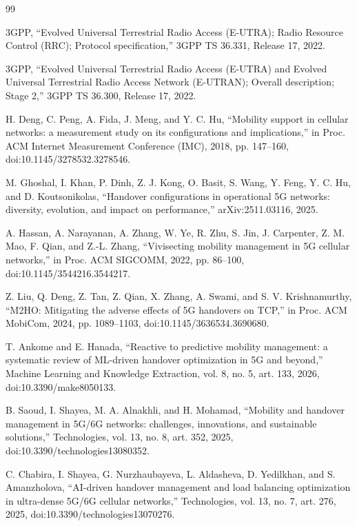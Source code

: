 \begin{thebibliography}{99}
\singlespacing
{} 3GPP, ``Evolved Universal Terrestrial Radio Access (E-UTRA); Radio Resource Control (RRC); Protocol specification,'' 3GPP TS 36.331, Release 17, 2022.

 3GPP, ``Evolved Universal Terrestrial Radio Access (E-UTRA) and Evolved Universal Terrestrial Radio Access Network (E-UTRAN); Overall description; Stage 2,'' 3GPP TS 36.300, Release 17, 2022.

 H. Deng, C. Peng, A. Fida, J. Meng, and Y. C. Hu, ``Mobility support in cellular networks: a measurement study on its configurations and implications,'' in Proc. ACM Internet Measurement Conference (IMC), 2018, pp. 147--160, doi:10.1145/3278532.3278546.

 M. Ghoshal, I. Khan, P. Dinh, Z. J. Kong, O. Basit, S. Wang, Y. Feng, Y. C. Hu, and D. Koutsonikolas, ``Handover configurations in operational 5G networks: diversity, evolution, and impact on performance,'' arXiv:2511.03116, 2025.

 A. Hassan, A. Narayanan, A. Zhang, W. Ye, R. Zhu, S. Jin, J. Carpenter, Z. M. Mao, F. Qian, and Z.-L. Zhang, ``Vivisecting mobility management in 5G cellular networks,'' in Proc. ACM SIGCOMM, 2022, pp. 86--100, doi:10.1145/3544216.3544217.

 Z. Liu, Q. Deng, Z. Tan, Z. Qian, X. Zhang, A. Swami, and S. V. Krishnamurthy, ``M2HO: Mitigating the adverse effects of 5G handovers on TCP,'' in Proc. ACM MobiCom, 2024, pp. 1089--1103, doi:10.1145/3636534.3690680.

 T. Ankome and E. Hanada, ``Reactive to predictive mobility management: a systematic review of ML-driven handover optimization in 5G and beyond,'' Machine Learning and Knowledge Extraction, vol. 8, no. 5, art. 133, 2026, doi:10.3390/make8050133.

 B. Saoud, I. Shayea, M. A. Alnakhli, and H. Mohamad, ``Mobility and handover management in 5G/6G networks: challenges, innovations, and sustainable solutions,'' Technologies, vol. 13, no. 8, art. 352, 2025, doi:10.3390/technologies13080352.

 C. Chabira, I. Shayea, G. Nurzhaubayeva, L. Aldasheva, D. Yedilkhan, and S. Amanzholova, ``AI-driven handover management and load balancing optimization in ultra-dense 5G/6G cellular networks,'' Technologies, vol. 13, no. 7, art. 276, 2025, doi:10.3390/technologies13070276.


\end{thebibliography}
